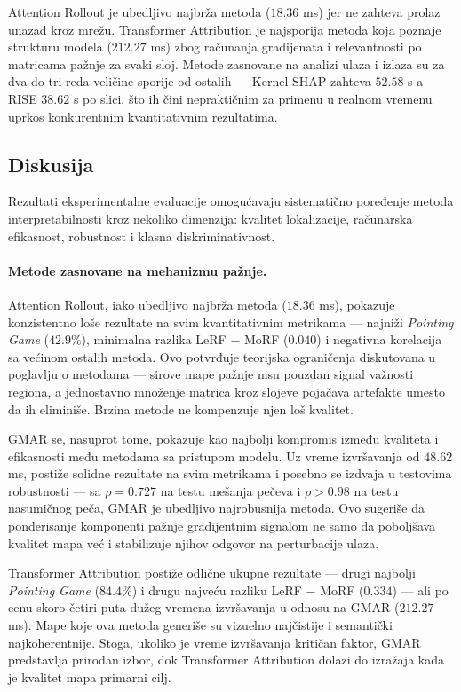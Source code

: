 Attention Rollout je ubedljivo najbrža metoda ($18.36$ ms) jer ne zahteva  prolaz unazad kroz mrežu. Transformer Attribution je najsporija  metoda koja poznaje strukturu modela ($212.27$ ms) zbog računanja gradijenata i relevantnosti po matricama pažnje za 
svaki sloj. Metode zasnovane na analizi ulaza i izlaza su za dva do tri reda veličine sporije od ostalih — Kernel SHAP zahteva $52.58$ s a RISE $38.62$ s po slici, što ih čini nepraktičnim za primenu u realnom vremenu uprkos konkurentnim kvantitativnim rezultatima.
\newpage
\subsection{Diskusija}

Rezultati eksperimentalne evaluacije omogućavaju sistematično poređenje 
metoda interpretabilnosti kroz nekoliko dimenzija: kvalitet lokalizacije, 
računarska efikasnost, robustnost i klasna diskriminativnost.

\paragraph{Metode zasnovane na mehanizmu pažnje.}
Attention Rollout, iako ubedljivo najbrža metoda ($18.36$ ms), pokazuje 
konzistentno loše rezultate na svim kvantitativnim metrikama — najniži 
\textit{Pointing Game} ($42.9\%$), minimalna razlika LeRF $-$ MoRF 
($0.040$) i negativna korelacija sa većinom ostalih metoda. Ovo potvrđuje 
teorijska ograničenja diskutovana u poglavlju o metodama — sirove mape 
pažnje nisu pouzdan signal važnosti regiona, a jednostavno množenje 
matrica kroz slojeve pojačava artefakte umesto da ih eliminiše. Brzina 
metode ne kompenzuje njen loš kvalitet.

GMAR se, nasuprot tome, pokazuje kao najbolji kompromis između kvaliteta 
i efikasnosti među metodama sa pristupom modelu. Uz vreme izvršavanja od 
$48.62$ ms, postiže solidne rezultate na svim metrikama i posebno se 
izdvaja u testovima robustnosti — sa $\rho = 0.727$ na testu mešanja 
pečeva i $\rho > 0.98$ na testu nasumičnog peča, GMAR je ubedljivo 
najrobusnija metoda. Ovo sugeriše da ponderisanje komponenti pažnje gradijentnim signalom ne samo da poboljšava kvalitet mapa već i stabilizuje njihov odgovor na perturbacije ulaza.

Transformer Attribution postiže odlične ukupne rezultate — drugi najbolji 
\textit{Pointing Game} ($84.4\%$) i drugu najveću razliku LeRF $-$ MoRF 
($0.334$) — ali po cenu skoro četiri puta dužeg vremena izvršavanja u 
odnosu na GMAR ($212.27$ ms). Mape koje ova metoda generiše su vizuelno 
najčistije i semantički najkoherentnije. Stoga, ukoliko je vreme izvršavanja 
kritičan faktor, GMAR predstavlja prirodan izbor, dok Transformer 
Attribution dolazi do izražaja kada je kvalitet mapa primarni cilj.

